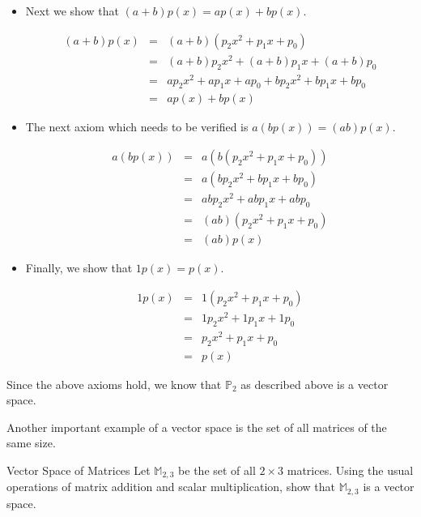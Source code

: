 \begin{solution}
\begin{itemize}
\item
Next we show that $(a+b) p(x) = ap(x) + bp(x)$. 

\begin{eqnarray*} 
(a+b) p(x) &=& (a+b) ( p_2x^2 + p_1x + p_0)\\
&=& (a+b)p_2x^2 + (a+b)p_1x + (a+b)p_0   \\
&=&  ap_2x^2 + ap_1x + ap_0 + bp_2x^2 +bp_1x + bp_0\\
&=& ap(x) + bp(x)
\end{eqnarray*}

\item
The next axiom which needs to be verified is $a(bp(x)) = (ab)p(x)$. 

\begin{eqnarray*}
a(bp(x)) &=& a \left(  b \left(p_2x^2 + p_1x +p_0\right)\right) \\
&=& a \left(  bp_2x^2 +bp_1x + bp_0 \right)\\
&=&  abp_2x^2 + abp_1x + abp_0 \\
&=& (ab) \left( p_2x^2 +p_1x + p_0 \right)\\
&=& (ab) p(x) 
\end{eqnarray*}

\item 
Finally, we show that $1p(x) = p(x)$. 

\begin{eqnarray*}
1p(x) &=& 1 \left(  p_2x^2  + p_1x +  p_0\right)\\
&=&  1p_2x^2 + 1p_1x + 1p_0\\
&=&  p_2x^2 + p_1x + p_0\\
&=& p(x)
\end{eqnarray*}

\end{itemize}

Since the above axioms hold, we know that $\mathbb{P}_2$ as described above is a vector space. 
\end{solution}

Another important example of a vector space is the set of all matrices of the same size. 

\begin{example}{Vector Space of Matrices}\label{exa:vectorspacematrices}
Let $\mathbb{M}_{2,3}$ be the set of all $2 \times 3$ matrices. Using the usual operations of matrix addition and scalar multiplication, show that $\mathbb{M}_{2,3}$ is a vector space. 
\end{example}

